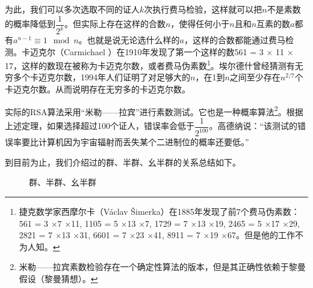 \documentclass[b5paper]{ctexart}
\begin{document}
为此，我们可以多次选取不同的证人$k$次执行费马检验，这样就可以把$n$不是素数的概率降低到$\dfrac{1}{2^k}$。但实际上存在这样的合数$n$，使得任何小于$n$且和$n$互素的数$a$都有$a^{n-1} \equiv 1 \mod n$。也就是说无论选什么样的$a$，这样的合数都能通过费马检测。卡迈克尔（Carmichael ）在1910年发现了第一个这样的数561 = 3 $\times$ 11 $\times$ 17，这样的数现在被称为卡迈克尔数，或者费马伪素数\footnote{捷克数学家西摩尔卡（Václav Šimerka）在1885年发现了前7个费马伪素数：561 = 3 $\times$7 $\times$11, 1105 = 5 $\times$13 $\times$7, 1729 = 7 $\times$13 $\times$19, 2465 = 5 $\times$17 $\times$29, 2821 = 7 $\times$13 $\times$31, 6601 = 7 $\times$23 $\times$41, 8911 = 7 $\times$19 $\times$67。但是他的工作不为人知。}。埃尔德什曾经猜测有无穷多个卡迈克尔数，1994年人们证明了对足够大的$n$，在1到$n$之间至少存在$n^{2/7}$个卡迈克尔数。从而说明存在无穷多的卡迈克尔数\cite{Wiki-Carmichael-number}。

实际的RSA算法采用“米勒——拉宾”进行素数测试。它也是一种概率算法\footnote{米勒——拉宾素数检验存在一个确定性算法的版本，但是其正确性依赖于黎曼假设（黎曼猜想）\cite{Wiki-Miller-Rabin}。}。根据上述定理，如果选择超过100个证人，错误率会低于$\dfrac{1}{2^{100}}$。高德纳说：“该测试的错误率要比计算机因为宇宙辐射而丢失某个二进制位的概率还要低。”

\vspace{5mm}

到目前为止，我们介绍过的群、半群、幺半群的关系总结如下。

\begin{figure}[htbp]
\centering
{}
\caption{群、半群、幺半群}
\label{fig:groups}
\end{figure}
\end{document}
